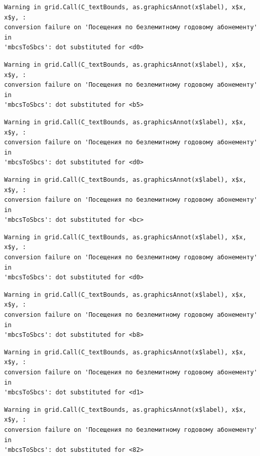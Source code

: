 \documentclass[
  letterpaper,
  DIV=11,
  numbers=noendperiod]{scrartcl}
\begin{document}
\begin{verbatim}
Warning in grid.Call(C_textBounds, as.graphicsAnnot(x$label), x$x, x$y, :
conversion failure on 'Посещения по безлемитному годовому абонементу' in
'mbcsToSbcs': dot substituted for <d0>
\end{verbatim}

\begin{verbatim}
Warning in grid.Call(C_textBounds, as.graphicsAnnot(x$label), x$x, x$y, :
conversion failure on 'Посещения по безлемитному годовому абонементу' in
'mbcsToSbcs': dot substituted for <b5>
\end{verbatim}

\begin{verbatim}
Warning in grid.Call(C_textBounds, as.graphicsAnnot(x$label), x$x, x$y, :
conversion failure on 'Посещения по безлемитному годовому абонементу' in
'mbcsToSbcs': dot substituted for <d0>
\end{verbatim}

\begin{verbatim}
Warning in grid.Call(C_textBounds, as.graphicsAnnot(x$label), x$x, x$y, :
conversion failure on 'Посещения по безлемитному годовому абонементу' in
'mbcsToSbcs': dot substituted for <bc>
\end{verbatim}

\begin{verbatim}
Warning in grid.Call(C_textBounds, as.graphicsAnnot(x$label), x$x, x$y, :
conversion failure on 'Посещения по безлемитному годовому абонементу' in
'mbcsToSbcs': dot substituted for <d0>
\end{verbatim}

\begin{verbatim}
Warning in grid.Call(C_textBounds, as.graphicsAnnot(x$label), x$x, x$y, :
conversion failure on 'Посещения по безлемитному годовому абонементу' in
'mbcsToSbcs': dot substituted for <b8>
\end{verbatim}

\begin{verbatim}
Warning in grid.Call(C_textBounds, as.graphicsAnnot(x$label), x$x, x$y, :
conversion failure on 'Посещения по безлемитному годовому абонементу' in
'mbcsToSbcs': dot substituted for <d1>
\end{verbatim}

\begin{verbatim}
Warning in grid.Call(C_textBounds, as.graphicsAnnot(x$label), x$x, x$y, :
conversion failure on 'Посещения по безлемитному годовому абонементу' in
'mbcsToSbcs': dot substituted for <82>
\end{verbatim}
\end{document}
